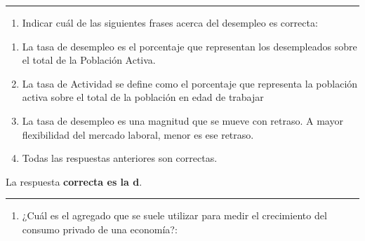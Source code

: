 \documentclass[
  letterpaper,
  DIV=11,
  numbers=noendperiod]{scrreprt}
\providecommand{\tightlist}{%
  \setlength{\itemsep}{0pt}\setlength{\parskip}{0pt}}\usepackage{longtable,booktabs,array}
\begin{document}
\begin{center}\rule{0.5\linewidth}{0.5pt}\end{center}

\begin{enumerate}
\def\labelenumi{\arabic{enumi}.}
\setcounter{enumi}{61}
\tightlist
\item
  Indicar cuál de las siguientes frases acerca del desempleo es
  correcta:
\end{enumerate}

\begin{enumerate}
\def\labelenumi{\alph{enumi}.}
\item
  La tasa de desempleo es el porcentaje que representan los desempleados
  sobre el total de la Población Activa.
\item
  La tasa de Actividad se define como el porcentaje que representa la
  población activa sobre el total de la población en edad de trabajar
\item
  La tasa de desempleo es una magnitud que se mueve con retraso. A mayor
  flexibilidad del mercado laboral, menor es ese retraso.
\item
  Todas las respuestas anteriores son correctas.
\end{enumerate}

\begin{tcolorbox}[enhanced jigsaw, left=2mm, opacityback=0, colback=white, breakable, arc=.35mm, bottomrule=.15mm, rightrule=.15mm, toprule=.15mm, leftrule=.75mm, colframe=quarto-callout-tip-color-frame]
\begin{minipage}[t]{5.5mm}
\textcolor{quarto-callout-tip-color}{\faLightbulb}
\end{minipage}%
\begin{minipage}[t]{\textwidth - 5.5mm}

La respuesta \textbf{correcta es la d}.

\end{minipage}%
\end{tcolorbox}

\begin{center}\rule{0.5\linewidth}{0.5pt}\end{center}

\begin{enumerate}
\def\labelenumi{\arabic{enumi}.}
\setcounter{enumi}{62}
\tightlist
\item
  ¿Cuál es el agregado que se suele utilizar para medir el crecimiento
  del consumo privado de una economía?:
\end{enumerate}
\end{document}

